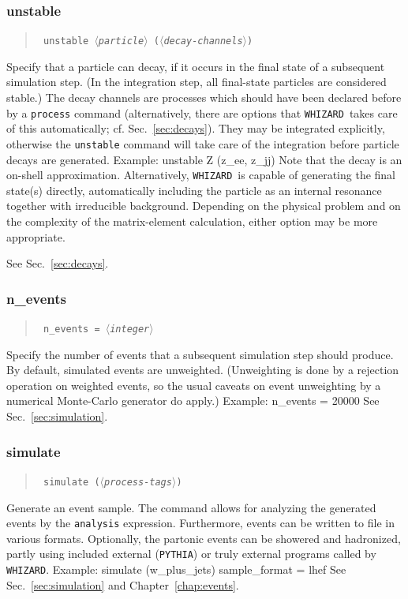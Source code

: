 \documentclass[12pt]{book}
\newenvironment{code}%
  {\begingroup\footnotesize
   \quote
   \Verbatim}%
  {\endVerbatim
   \endquote
   \endgroup\noindent}
\newenvironment{syntax}%
  {\begin{quote}
   \begin{flushleft}\tt}%
  {\end{flushleft}
   \end{quote}}
\newcommand{\var}[1]{$\langle$\textit{#1}$\rangle$}
\newcommand{\ttt}[1]{\texttt{#1}}
\newcommand{\whizard}{\ttt{WHIZARD}}
\newcommand{\pythia}{\ttt{PYTHIA}}
\begin{document}
\subsubsection{unstable}
\begin{syntax}
unstable \var{particle} (\var{decay-channels})
\end{syntax}
Specify that a particle can decay, if it occurs in the final state of a
subsequent simulation step.  (In the integration step, all final-state
particles are considered stable.)  The decay channels are processes which
should have been declared before by a \ttt{process} command
(alternatively, there are options that \whizard\ takes care of this
automatically; cf. Sec.~\ref{sec:decays}).  They may be
integrated explicitly, otherwise the \ttt{unstable} command will take care of
the integration before particle decays are generated.  Example:
\begin{code}
unstable Z (z_ee, z_jj)
\end{code}
Note that the decay is an on-shell approximation.  Alternatively, \whizard\ is
capable of generating the final state(s) directly, automatically including the
particle as an internal resonance together with irreducible background.
Depending on the physical problem and on the complexity of the matrix-element
calculation, either option may be more appropriate.

See Sec.~\ref{sec:decays}.


\subsubsection{n\_events}
\begin{syntax}
n\_events = \var{integer}
\end{syntax}
Specify the number of events that a subsequent simulation step should produce.
By default, simulated events are unweighted.  (Unweighting is done by a
rejection operation on weighted events, so the usual caveats on event
unweighting by a numerical Monte-Carlo generator do apply.)  Example:
\begin{code}
n_events = 20000
\end{code}
See Sec.~\ref{sec:simulation}.


\subsubsection{simulate}
\begin{syntax}
simulate (\var{process-tags})
\end{syntax}
Generate an event sample.  The command allows for analyzing the generated
events by the \ttt{analysis} expression.  Furthermore, events can be written
to file in various formats.  Optionally, the partonic events can be showered
and hadronized, partly using included external (\pythia) or truly
external programs called by \whizard. Example:
\begin{code}
simulate (w_plus_jets) { sample_format = lhef }
\end{code}
See Sec.~\ref{sec:simulation} and Chapter~\ref{chap:events}.
\end{document}
